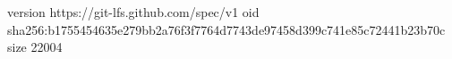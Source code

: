 version https://git-lfs.github.com/spec/v1
oid sha256:b1755454635e279bb2a76f3f7764d7743de97458d399c741e85c72441b23b70c
size 22004
